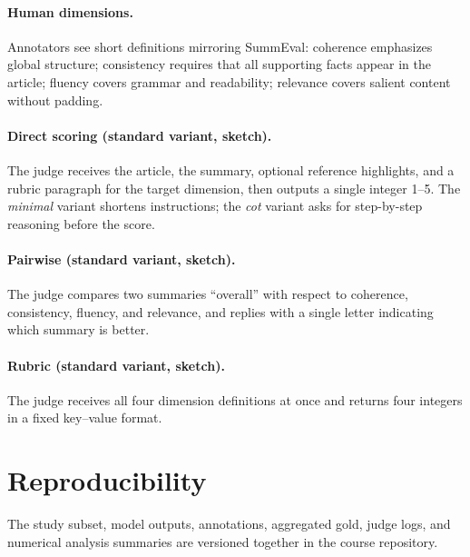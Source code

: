 \documentclass[11pt]{article}
\begin{document}
\paragraph{Human dimensions.}
Annotators see short definitions mirroring SummEval: coherence emphasizes global structure; consistency requires that all supporting facts appear in the article; fluency covers grammar and readability; relevance covers salient content without padding.

\paragraph{Direct scoring (standard variant, sketch).}
The judge receives the article, the summary, optional reference highlights, and a rubric paragraph for the target dimension, then outputs a single integer 1--5. The \emph{minimal} variant shortens instructions; the \emph{cot} variant asks for step-by-step reasoning before the score.

\paragraph{Pairwise (standard variant, sketch).}
The judge compares two summaries ``overall'' with respect to coherence, consistency, fluency, and relevance, and replies with a single letter indicating which summary is better.

\paragraph{Rubric (standard variant, sketch).}
The judge receives all four dimension definitions at once and returns four integers in a fixed key--value format.

\section{Reproducibility}

The study subset, model outputs, annotations, aggregated gold, judge logs, and numerical analysis summaries are versioned together in the course repository.
\end{document}
